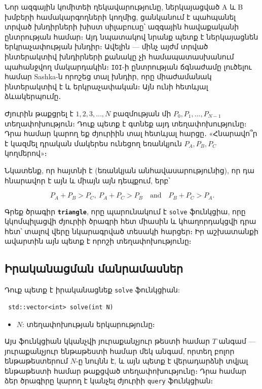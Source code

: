 \documentclass[12pt]{article}
\begin{document}
\renewcommand{\headerLang}{English}
\renewcommand{\problemName}{AB23. TRIANGLE}

\renewcommand{\headerLeft}{IATI Day 2, Senior group}
\renewcommand{\headerRightFirst}{XVII INTERNATIONAL ADVANCED TOURNAMENT IN INFORMATICS}
\renewcommand{\headerRightSecond}{ONLINE 2026}

\renewcommand{\tl}{$10$ sec.}
\renewcommand{\ml}{$1024$ MB}
\problem{Problem \problemName}

Նոր ազգային կոմիտեի ղեկավարությունը, ներկայացված A և B խմբերի համակարգողների կողմից, ցանկանում է պահպանել տրված խնդիրների խիստ սիլաբուսը՝ ազգային հավաքականի ընտրության համար։ Այդ նպատակով նրանք պետք է ներկայացնեն երկրաչափության խնդիր։ Ավելին — մինչ այժմ տրված ինտերակտիվ խնդիրների քանակը չի համապատասխանում պահանջվող մակարդակին։ \texttt{IOI}-ի ընտրության ճգնաժամը լուծելու համար Sashka-ն որոշեց տալ խնդիր, որը միաժամանակ ինտերակտիվ է և երկրաչափական։ Այն ունի հետևյալ ձևակերպումը․

Ժյուրին թաքցրել է ${1,2,3,...,N}$ բազմության մի $P_0,P_1,...,P_{N-1}$ տեղափոխություն։ Դուք պետք է գտնեք այդ տեղափոխությունը։ Դրա համար կարող եք ժյուրիին տալ հետևյալ հարցը․ «Հնարավո՞ր է կազմել դրական մակերես ունեցող եռանկյուն $P_A,P_B,P_C$ կողմերով»։

Նկատենք, որ հայտնի է (եռանկյան անհավասարությունից), որ դա հնարավոր է այն և միայն այն դեպքում, երբ՝

\[P_A + P_B > P_C,\ P_A + P_C > P_B \quad \text{and} \quad P_B + P_C > P_A.\]

Գրեք ծրագիր \textbf{\texttt{triangle}}, որը պարունակում է \texttt{solve} ֆունկցիա, որը կկոմպիլացվի ժյուրիի ծրագրի հետ միասին և կհաղորդակցվի դրա հետ՝ տալով վերը նկարագրված տեսակի հարցեր։ Իր աշխատանքի ավարտին այն պետք է որոշի տեղափոխությունը։

\subsection{Իրականացման մանրամասներ}
Դուք պետք է իրականացնեք \texttt{solve} ֆունկցիան:
\begin{lstlisting}
 std::vector<int> solve(int N)
\end{lstlisting}
\begin{itemize}
	\item $N$: տեղափոխության երկարությունը։
\end{itemize}

Այս ֆունկցիան կկանչվի յուրաքանչյուր թեստի համար $T$ անգամ — յուրաքանչյուր ենթաթեստի համար մեկ անգամ, որտեղ բոլոր ենթաթեստերում $N$-ը նույնն է, և այն պետք է վերադարձնի տվյալ ենթաթեստի համար թաքցված տեղափոխությունը։ Դրա համար ձեր ծրագիրը կարող է կանչել ժյուրիի \texttt{query} ֆունկցիան։
\end{document}
